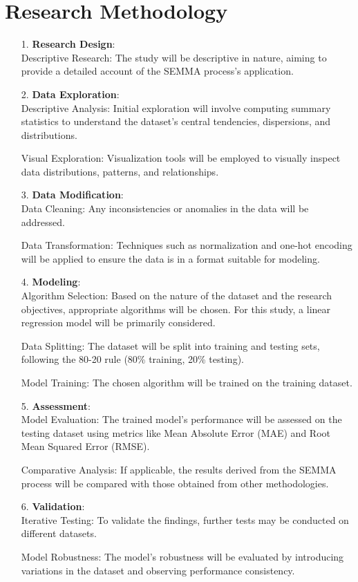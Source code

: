 \documentclass{article}
\begin{document}
\section*{Research Methodology}
\begin{itemize}
    \item[1.]\textbf{Research Design}:\\
Descriptive Research: The study will be descriptive in nature, aiming to provide a detailed account of the SEMMA process's application.
    \item[2.]\textbf{Data Exploration}:\\
Descriptive Analysis: Initial exploration will involve computing summary statistics to understand the dataset's central tendencies, dispersions, and distributions.

Visual Exploration: Visualization tools will be employed to visually inspect data distributions, patterns, and relationships.
    \item[3.]\textbf{Data Modification}:\\
Data Cleaning: Any inconsistencies or anomalies in the data will be addressed.

Data Transformation: Techniques such as normalization and one-hot encoding will be applied to ensure the data is in a format suitable for modeling.
    \item[4.]\textbf{ Modeling}:\\
Algorithm Selection: Based on the nature of the dataset and the research objectives, appropriate algorithms will be chosen. For this study, a linear regression model will be primarily considered.

Data Splitting: The dataset will be split into training and testing sets, following the 80-20 rule (80\% training, 20\% testing).

Model Training: The chosen algorithm will be trained on the training dataset.
    \item[5.]\textbf{Assessment}:\\
Model Evaluation: The trained model's performance will be assessed on the testing dataset using metrics like Mean Absolute Error (MAE) and Root Mean Squared Error (RMSE).

Comparative Analysis: If applicable, the results derived from the SEMMA process will be compared with those obtained from other methodologies.
    \item[6.]\textbf{Validation}:\\
Iterative Testing: To validate the findings, further tests may be conducted on different datasets.

Model Robustness: The model's robustness will be evaluated by introducing variations in the dataset and observing performance consistency.

\end{itemize}
\end{document}
